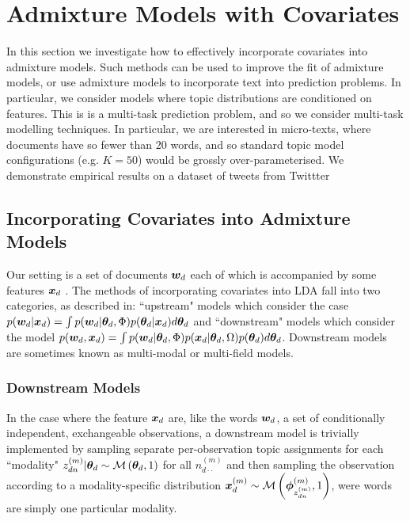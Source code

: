
\section{Admixture Models with Covariates}
In this section we investigate how to effectively incorporate covariates into admixture models. Such methods can be used to improve the fit of admixture models, or use admixture models to incorporate text into prediction problems. In particular, we consider models where topic distributions are conditioned on features. This is is a multi-task prediction problem, and so we consider multi-task modelling techniques. In particular, we are interested in micro-texts, where documents have so fewer than 20 words, and so standard topic model configurations (e.g. $K=50$) would be grossly over-parameterised. We demonstrate empirical results on a dataset of tweets from Twittter

\subsection{Incorporating Covariates into Admixture Models}
Our setting is a set of documents $\bm w_d$ each of which is accompanied by some features $\bm x_d$ . The methods of incorporating covariates into LDA fall into two categories, as described in\cite{Mimno2008}: ``upstream" models which consider the case $p({ \bm w_d } | { \bm x_d }) = \int p({ \bm w_d }|{ \bm \theta_d }, \Phi)p({ \bm \theta_d }|{ \bm x_d }) d{ \bm \theta_d }$ 
and ``downstream" models which consider the model $p({ \bm w_d }, { \bm x_d }) = \int p({ \bm w_d }|{ \bm \theta_d }, \Phi)p({ \bm x_d }|{ \bm \theta_d }, \Omega)p({ \bm \theta_d })d{ \bm \theta_d }$. Downstream models are sometimes known as multi-modal\cite{Virtanen2012a} or multi-field\cite{Salomatin2009} models.

\subsubsection{Downstream Models}
In the case where the feature ${ \bm x_d }$ are, like the words ${ \bm w_d }$, a set of conditionally independent, exchangeable observations, a downstream model is trivially implemented\cite{Erosheva2004}\cite{Blei2003} by sampling separate per-observation topic assignments for each ``modality" $z_{dn}^{(m)}|{ \bm \theta_d } \sim \mathcal{M} \left( {{ \bm \theta_d }},{1} \right)$ for all $n_{d\cdot\cdot}^{(m)}$ and then sampling the observation according to a modality-specific distribution $\bm x_d^{(m)} \sim \mathcal{M} \left( {\bm \phi^{(m)}_{z^{(m)}_{dn}}},{1} \right)$, were words are simply one particular modality.

